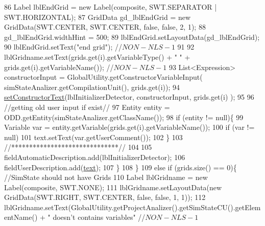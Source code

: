 \begin{DoxyCode}
86                 Label lblEndGrid = \textcolor{keyword}{new} Label(composite, SWT.SEPARATOR | SWT.HORIZONTAL);
87                 GridData gd\_lblEndGrid = \textcolor{keyword}{new} GridData(SWT.CENTER, SWT.CENTER, \textcolor{keyword}{false}, \textcolor{keyword}{false}, 2, 1);
88                 gd\_lblEndGrid.widthHint = 500;
89                 lblEndGrid.setLayoutData(gd\_lblEndGrid);
90                 lblEndGrid.setText(\textcolor{stringliteral}{"end grid"}); \textcolor{comment}{//$NON-NLS-1$}
91                 
92                 lblGridname.setText(grids.get(i).getVariableType() + \textcolor{stringliteral}{" "} + grids.get(i).getVariableName());     
       \textcolor{comment}{//$NON-NLS-1$}
93                 List<Expression> constructorInput = GlobalUtility.getConstructorVariableInput(
      simStateAnalizer.getCompilationUnit(), grids.get(i));
94                 \hyperlink{classit_1_1isislab_1_1masonassisteddocumentation_1_1mason_1_1wizards_1_1_g___grids_cell_page_ad9069cbfc289b5549376270b2bc35c21}{setConstructorText}(lblInitializerDetector, constructorInput, grids.get(i)
      );       
95                 
96                 \textcolor{comment}{//getting old user input if exist//}
97                 Entity entity = ODD.getEntity(simStateAnalizer.getClassName());
98                 \textcolor{keywordflow}{if} (entity != null)\{
99                     Variable var = entity.getVariable(grids.get(i).getVariableName());
100                     \textcolor{keywordflow}{if} (var != null)
101                         text.setText(var.getUserComment());
102                 \}
103                 \textcolor{comment}{//******************************//}
104                 
105                 fieldAutomaticDescription.add(lblInitializerDetector);
106                 fieldUserDescription.add(\hyperlink{classit_1_1isislab_1_1masonassisteddocumentation_1_1mason_1_1wizards_1_1_g___grids_cell_page_a04f37a0ddf6f1114dc54a0b9b6b97c03}{text});
107             \}
108         \}
109         \textcolor{keywordflow}{else} \textcolor{keywordflow}{if} (grids.size() == 0)\{    \textcolor{comment}{//SimState should not have Grids}
110             Label lblGridname = \textcolor{keyword}{new} Label(composite, SWT.NONE);
111             lblGridname.setLayoutData(\textcolor{keyword}{new} GridData(SWT.RIGHT, SWT.CENTER, \textcolor{keyword}{false}, \textcolor{keyword}{false}, 1, 1));
112             lblGridname.setText(GlobalUtility.getProjectAnalizer().getSimStateCU().getElementName() + \textcolor{stringliteral}{"
       doesn't contains variables"} \textcolor{comment}{//$NON-NLS-1$}

\end{DoxyCode}
